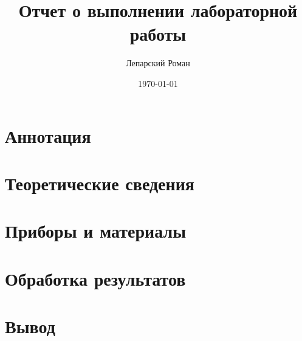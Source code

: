 \documentclass[a4paper, 12pt]{article}
\title{Отчет о выполнении лабораторной работы \\ }
\author{Лепарский Роман}
\date{\today}
\begin{document}
	
	\section{Аннотация}



	\section{Теоретические сведения}



	\section{Приборы и материалы}



	\section{Обработка результатов}



	\section{Вывод}
\end{document}
